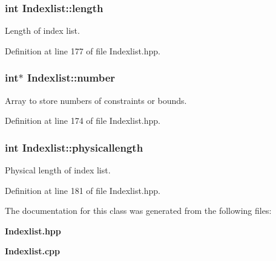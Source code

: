 \subsubsection[{length}]{\setlength{\rightskip}{0pt plus 5cm}int {\bf Indexlist::length}\hspace{0.3cm}{\ttfamily  [protected]}}\label{classIndexlist_a884668aadf23027e57c12739ef37c12b}
Length of index list. 

Definition at line 177 of file Indexlist.hpp.

\subsubsection[{number}]{\setlength{\rightskip}{0pt plus 5cm}int$\ast$ {\bf Indexlist::number}\hspace{0.3cm}{\ttfamily  [protected]}}\label{classIndexlist_aede0cb27f83052ccf65327e9fa602342}
Array to store numbers of constraints or bounds. 

Definition at line 174 of file Indexlist.hpp.

\subsubsection[{physicallength}]{\setlength{\rightskip}{0pt plus 5cm}int {\bf Indexlist::physicallength}\hspace{0.3cm}{\ttfamily  [protected]}}\label{classIndexlist_a1207c42b696c50fa882565835ec09802}
Physical length of index list. 

Definition at line 181 of file Indexlist.hpp.



The documentation for this class was generated from the following files:\begin{DoxyCompactItemize}
\item 
{\bf Indexlist.hpp}\item 
{\bf Indexlist.cpp}\end{DoxyCompactItemize}
